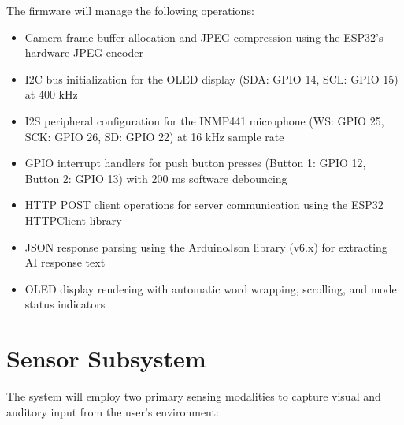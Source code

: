 The firmware will manage the following operations:

\begin{itemize}[leftmargin=1.5cm]
\item Camera frame buffer allocation and JPEG compression using the ESP32's hardware JPEG encoder
\item I2C bus initialization for the OLED display (SDA: GPIO 14, SCL: GPIO 15) at 400 kHz
\item I2S peripheral configuration for the INMP441 microphone (WS: GPIO 25, SCK: GPIO 26, SD: GPIO 22) at 16 kHz sample rate
\item GPIO interrupt handlers for push button presses (Button 1: GPIO 12, Button 2: GPIO 13) with 200 ms software debouncing
\item HTTP POST client operations for server communication using the ESP32 HTTPClient library
\item JSON response parsing using the ArduinoJson library (v6.x) for extracting AI response text
\item OLED display rendering with automatic word wrapping, scrolling, and mode status indicators
\end{itemize}

\section{Sensor Subsystem}
The system will employ two primary sensing modalities to capture visual and auditory input from the user's environment:

